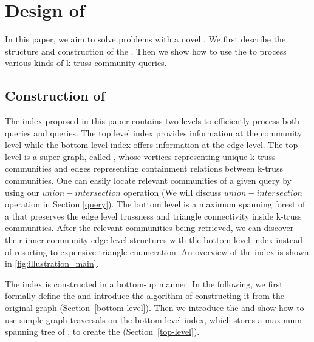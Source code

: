 \section{Design of \TwoLevelIndex{}}
\label{index}

In this paper, we aim to solve \probdef{} problems with a novel \twolevelindex{}. We first describe the structure and construction of the \twolevelindex{}. Then we show how to use the \twolevelindex{} to process various kinds of k-truss community queries.

\subsection{Construction of \TwoLevelIndex{}}
\label{index}

The index proposed in this paper contains two levels to efficiently process both \toplevelprob{} queries and \bottomlevelprob{} queries. The top level index provides information at the community level while the bottom level index offers information at the edge level. The top level is a super-graph, called \treeindex{}, whose vertices representing unique k-truss communities and edges representing containment relations between k-truss communities. One can easily locate relevant communities of a given query by using our $union-intersection$ operation (We will discuss $union-intersection$ operation in Section \ref{query}). The bottom level is a maximum spanning forest of a \inducedgraph{} that preserves the edge level trussness and triangle connectivity inside k-truss communities. After the relevant communities being retrieved, we can discover their inner community edge-level structures with the bottom level index instead of resorting to expensive triangle enumeration. An overview of the index is shown in \autoref{fig:illustration_main}. 

The index is constructed in a bottom-up manner. In the following, we first formally define the \inducedgraph{} and introduce the algorithm of constructing it from the original graph (Section~\ref{bottom-level}). Then we introduce the \treeindex{} and show how to use simple graph traversals on the bottom level index, which stores a maximum spanning tree of \inducedgraph{}, to create the \treeindex{} (Section~\ref{top-level}). 


